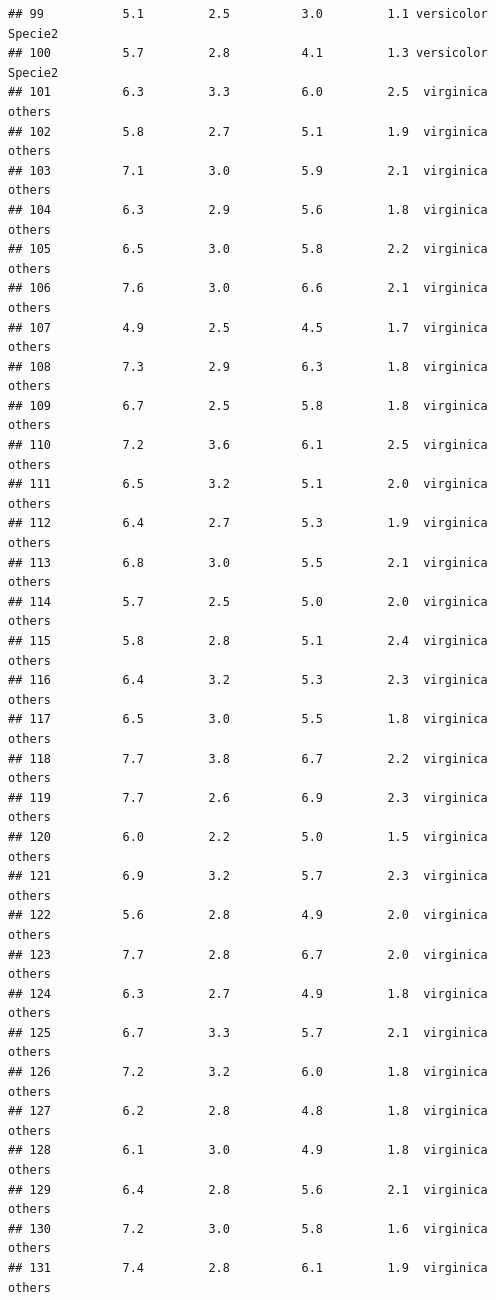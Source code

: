 \documentclass[
]{book}
\begin{document}
\begin{verbatim}
## 99           5.1         2.5          3.0         1.1 versicolor    Specie2
## 100          5.7         2.8          4.1         1.3 versicolor    Specie2
## 101          6.3         3.3          6.0         2.5  virginica     others
## 102          5.8         2.7          5.1         1.9  virginica     others
## 103          7.1         3.0          5.9         2.1  virginica     others
## 104          6.3         2.9          5.6         1.8  virginica     others
## 105          6.5         3.0          5.8         2.2  virginica     others
## 106          7.6         3.0          6.6         2.1  virginica     others
## 107          4.9         2.5          4.5         1.7  virginica     others
## 108          7.3         2.9          6.3         1.8  virginica     others
## 109          6.7         2.5          5.8         1.8  virginica     others
## 110          7.2         3.6          6.1         2.5  virginica     others
## 111          6.5         3.2          5.1         2.0  virginica     others
## 112          6.4         2.7          5.3         1.9  virginica     others
## 113          6.8         3.0          5.5         2.1  virginica     others
## 114          5.7         2.5          5.0         2.0  virginica     others
## 115          5.8         2.8          5.1         2.4  virginica     others
## 116          6.4         3.2          5.3         2.3  virginica     others
## 117          6.5         3.0          5.5         1.8  virginica     others
## 118          7.7         3.8          6.7         2.2  virginica     others
## 119          7.7         2.6          6.9         2.3  virginica     others
## 120          6.0         2.2          5.0         1.5  virginica     others
## 121          6.9         3.2          5.7         2.3  virginica     others
## 122          5.6         2.8          4.9         2.0  virginica     others
## 123          7.7         2.8          6.7         2.0  virginica     others
## 124          6.3         2.7          4.9         1.8  virginica     others
## 125          6.7         3.3          5.7         2.1  virginica     others
## 126          7.2         3.2          6.0         1.8  virginica     others
## 127          6.2         2.8          4.8         1.8  virginica     others
## 128          6.1         3.0          4.9         1.8  virginica     others
## 129          6.4         2.8          5.6         2.1  virginica     others
## 130          7.2         3.0          5.8         1.6  virginica     others
## 131          7.4         2.8          6.1         1.9  virginica     others

\end{verbatim}
\end{document}
